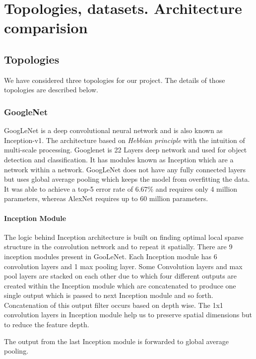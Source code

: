 \documentclass[titlepage]{report}
\begin{document}

\chapter{Topologies, datasets. Architecture comparision}

\section{Topologies}
We have considered three topologies for our project. The details of those topologies are described below.

\subsection{GoogleNet}
GoogLeNet is a deep convolutional neural network and is also known as Inception-v1. The architecture based on \textit{Hebbian principle} with the intuition of multi-scale processing. Googlenet is 22 Layers deep network and used for object detection and classification. It has modules known as Inception which are a network within a network. GoogLeNet does not have any fully connected layers but uses global average pooling which keeps the model from overfitting the data.
It was able to achieve a top-5 error rate of 6.67\% and requires only 4 million parameters, whereas AlexNet requires up to 60 million parameters.

\subsubsection{Inception Module}
The logic behind Inception architecture is built on finding optimal local sparse structure in the convolution network and to repeat it spatially. There are 9 inception modules present in GooLeNet. Each Inception module has 6 convolution layers and 1 max pooling layer. Some Convolution layers and max pool layers are stacked on each other due to which four different outputs are created within the Inception module which are concatenated to produce one single output which is passed to next Inception module and so forth. Concatenation of this output filter occurs based on depth wise. The 1x1 convolution layers in Inception module help us to preserve spatial dimensions but to reduce the feature depth.

The output from the last Inception module is forwarded to global average pooling.
\end{document}
